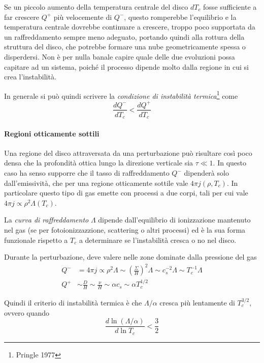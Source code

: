\documentclass[a4paperbi]{article}
\begin{document}
	Se un piccolo aumento della temperatura centrale del disco $dT_c$ fosse sufficiente a far crescere $Q^+$ più velocemente di $Q^-$, questo romperebbe l'equilibrio e la temperatura centrale dovrebbe continuare a crescere, troppo poco supportata da un raffreddamento sempre meno adeguato, portando quindi alla rottura della struttura del disco, che potrebbe formare una nube geometricamente spessa o disperdersi. Non è per nulla banale capire quale delle due evoluzioni possa capitare ad un sistema, poiché il processo dipende molto dalla regione in cui si crea l'instabilità.
	
	In generale si può quindi scrivere la \textit{condizione di instabilità termica}\footnote{Pringle 1977} come
	\begin{equation}
		\frac{dQ^-}{dT_c}<\frac{dQ^+}{dT_c}
	\end{equation}

	\paragraph{Regioni otticamente sottili}
	Una regione del disco attraversata da una perturbazione può risultare così poco densa che la profondità ottica lungo la direzione verticale sia $\tau\ll1$. In questo caso ha senso supporre che il tasso di raffreddamento $Q^-$ dipenderà solo dall'emissività, che per una regione otticamente sottile vale $4\pi j(\rho,T_c)$. In particolare questo tipo di gas emette con processi a due corpi, tali per cui vale $4\pi j\propto \rho^2\Lambda(T_c)$. 
	
	La \textit{curva di raffreddamento} $\Lambda$ dipende dall'equilibrio di ionizzazione mantenuto nel gas (se per fotoionizzazzione, scattering o altri processi) ed è la sua forma funzionale rispetto a $T_c$ a determinare se l'instabilità cresca o no nel disco.
	
	Durante la perturbazione, deve valere nelle zone dominate dalla pressione del gas
	\begin{align*}
		Q^-&=4\pi j\propto\rho^2\Lambda\sim\left(\frac{\Sigma}{H}\right)^2\Lambda\sim c_s^{-2}\Lambda\sim T_c^{-1}\Lambda\\
		Q^+&\sim\frac{D}{H}\sim\frac{\nu}{H}\sim\alpha c_s\sim\alpha T_c^{1/2}
	\end{align*}
	
	Quindi il criterio di instabilità termica è che $\Lambda/\alpha$ cresca più lentamente di $T_c^{3/2}$, ovvero quando
	\begin{equation}
		\frac{d\ln{(\Lambda/\alpha)}}{d\ln{T_c}}<\frac{3}{2}
	\end{equation}
	
\end{document}
